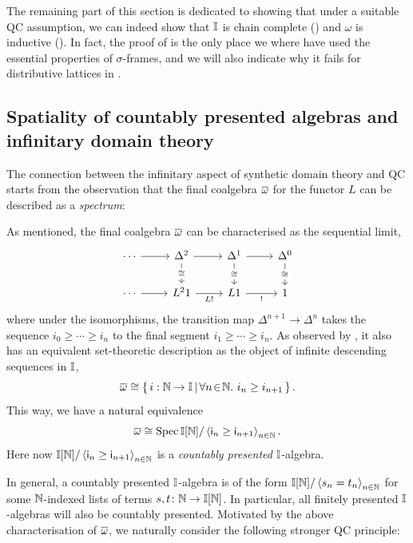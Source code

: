 The remaining part of this section is dedicated to showing that under a suitable \gls{QC} assumption, we can indeed show that $\mathbb{I}$ is chain complete () and $\omega$ is inductive (). In fact, the proof of  is the only place we where have used the essential properties of $\sigma$-frames, and we will also indicate why it fails for distributive lattices in .

\subsection{Spatiality of countably presented algebras and infinitary domain theory}
The connection between the infinitary aspect of synthetic domain theory and \gls{QC} starts from the observation that the final coalgebra $\overline{\omega}$ for the functor $L$ can be described as a \emph{spectrum}:

\begin{example}\label{exm:ovomegasober}
  As mentioned, the final coalgebra $\overline{\omega}$ can be characterised as the sequential limit,
  \[\begin{tikzcd}
    \cdots & {\Delta^2} & {\Delta^1} & {\Delta^0} \\
    \cdots & {L^21} & L1 & 1
    \arrow[from=1-1, to=1-2]
    \arrow[from=1-2, to=1-3]
    \arrow["\cong"{description}, from=1-2, to=2-2]
    \arrow[from=1-3, to=1-4]
    \arrow["\cong"{description}, from=1-3, to=2-3]
    \arrow["\cong"{description}, from=1-4, to=2-4]
    \arrow[from=2-1, to=2-2]
    \arrow["{L!}"', from=2-2, to=2-3]
    \arrow["{!}"', from=2-3, to=2-4]
  \end{tikzcd}\]
  where under the isomorphisms, the transition map $\Delta^{n+1} \to \Delta^n$ takes the sequence $i_0 \ge \cdots \ge i_n$ to the final segment $i_1 \ge \cdots \ge i_n$. As observed by \citet[Sec.\ 5.2]{hyland_first_2006}, it also has an equivalent set-theoretic description as the object of infinite descending sequences in $\mathbb{I}$,
  \[ \overline{\omega} \cong \left\{\,i : \mathbb{N} \to \mathbb{I}\,\middle|\,\forall n\!\in\!\mathbb{N}.\  i_n \ge i_{n+1}\,\right\}\text{.} \]
  This way, we have a natural equivalence
  \[ \overline{\omega} \cong \operatorname{Spec}\mathbb{I}[\mathbb{N}]/\left\langle\mathsf{i}_n \ge \mathsf{i}_{n+1}\right\rangle_{n\in\mathbb{N}}\text{.} \]
  Here now $\mathbb{I}[\mathbb{N}]/\left\langle\mathsf{i}_n \ge \mathsf{i}_{n+1}\right\rangle_{n\in\mathbb{N}}$ is a \emph{countably presented} $\mathbb{I}$-algebra.
\end{example}

In general, a countably presented $\mathbb{I}$-algebra is of the form $\mathbb{I}[\mathbb{N}]/\left\langle s_n = t_n\right\rangle_{n\in\mathbb{N}}$ for some $\mathbb{N}$-indexed lists of terms $s,t \colon \mathbb{N} \to \mathbb{I}[\mathbb{N}]$. In particular, all finitely presented $\mathbb{I}$-algebras will also be countably presented. Motivated by the above characterisation of $\overline{\omega}$, we naturally consider the following stronger \gls{QC} principle:


